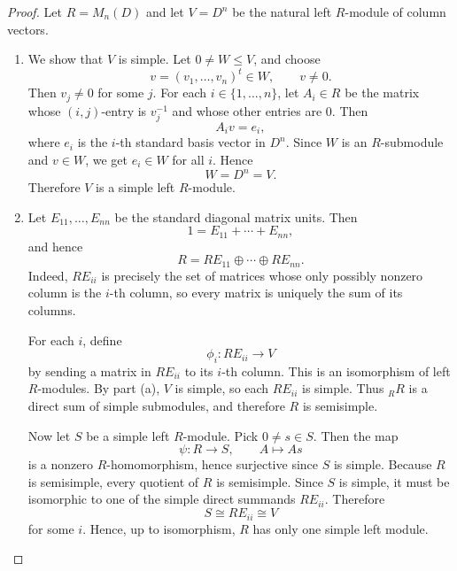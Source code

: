 \begin{proof}
    Let $R=M_n(D)$ and let $V=D^n$ be the natural left $R$-module of column vectors.

    \begin{enumerate}
        \renewcommand{\labelenumi}{(\alph{enumi})}

        \item We show that $V$ is simple. Let $0\neq W\leq V$, and choose
              \[
                  v=(v_1,\dots,v_n)^t\in W,\qquad v\neq 0.
              \]
              Then $v_j\neq 0$ for some $j$. For each $i\in \{1,\dots,n\}$, let $A_i\in R$ be the matrix whose $(i,j)$-entry is $v_j^{-1}$ and whose other entries are $0$. Then
              \[
                  A_i v=e_i,
              \]
              where $e_i$ is the $i$-th standard basis vector in $D^n$. Since $W$ is an $R$-submodule and $v\in W$, we get $e_i\in W$ for all $i$. Hence
              \[
                  W=D^n=V.
              \]
              Therefore $V$ is a simple left $R$-module.

        \item Let $E_{11},\dots,E_{nn}$ be the standard diagonal matrix units. Then
              \[
                  1=E_{11}+\cdots+E_{nn},
              \]
              and hence
              \[
                  R=RE_{11}\oplus\cdots\oplus RE_{nn}.
              \]
              Indeed, $RE_{ii}$ is precisely the set of matrices whose only possibly nonzero column is the $i$-th column, so every matrix is uniquely the sum of its columns.

              For each $i$, define
              \[
                  \phi_i:RE_{ii}\longrightarrow V
              \]
              by sending a matrix in $RE_{ii}$ to its $i$-th column. This is an isomorphism of left $R$-modules. By part (a), $V$ is simple, so each $RE_{ii}$ is simple. Thus $_RR$ is a direct sum of simple submodules, and therefore $R$ is semisimple.

              Now let $S$ be a simple left $R$-module. Pick $0\neq s\in S$. Then the map
              \[
                  \psi:R\longrightarrow S,\qquad A\mapsto As
              \]
              is a nonzero $R$-homomorphism, hence surjective since $S$ is simple. Because $R$ is semisimple, every quotient of $R$ is semisimple. Since $S$ is simple, it must be isomorphic to one of the simple direct summands $RE_{ii}$. Therefore
              \[
                  S\cong RE_{ii}\cong V
              \]
              for some $i$. Hence, up to isomorphism, $R$ has only one simple left module.


\end{enumerate}
\end{proof}
